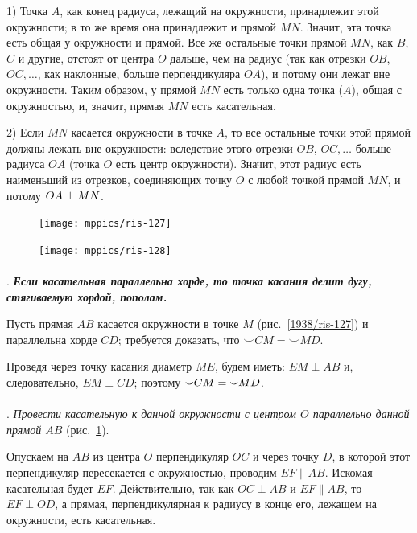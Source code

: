 \documentclass[oneside]{book}
\begin{document}
1) Точка $A$, как конец радиуса, лежащий на окружности, принадлежит этой окружности;
в то же время она принадлежит и прямой $MN$.
Значит, эта точка есть общая у окружности и прямой.
Все же остальные точки прямой $MN$, как $B$, $C$ и другие, отстоят от центра $O$ дальше, чем на радиус (так как отрезки $OB$, $OC,\dots$, как наклонные, больше перпендикуляра $OA$), и потому они лежат вне окружности.
Таким образом, у прямой $MN$ есть только одна точка ($A$), общая с окружностью, и, значит, прямая $MN$ есть касательная.

2) Если $MN$ касается окружности в точке $A$, то все остальные точки этой прямой должны лежать вне окружности: %
вследствие этого отрезки $OB$, $OC,\dots$
больше радиуса $OA$ (точка $O$ есть центр окружности).
Значит, этот радиус есть наименьший из отрезков, соединяющих точку $O$ с любой точкой прямой $MN$, и потому $OA\z\perp MN$.

\begin{figure}
\vskip-11mm
\centering
\texttt{[image: mppics/ris-127]}
\caption{}\label{1938/ris-127}
\bigskip
\texttt{[image: mppics/ris-128]}
\caption{}\label{1938/ris-128}
\end{figure}

\paragraph{}\label{1938/114}
\mbox{.}
\textbf{\emph{Если касательная параллельна хорде, то точка касания делит дугу, стягиваемую хордой, пополам.}}

Пусть прямая $AB$ касается окружности в точке $M$ (рис.~\ref{1938/ris-127}) и параллельна хорде $CD$;
требуется доказать, что ${\smallsmile}CM={\smallsmile}MD$.

Проведя через точку касания диаметр $ME$, будем иметь:
$EM\perp AB$ и, следовательно, $EM\perp CD$;
поэтому ${\smallsmile}CM\z={\smallsmile}MD$.

\paragraph{}\label{1938/115}
\mbox{.}
\emph{Провести касательную к данной окружности с центром $O$ параллельно данной прямой $AB$} (рис.~\ref{1938/ris-128}).

Опускаем на $AB$ из центра $O$ перпендикуляр $OC$ и через точку $D$, в которой этот перпендикуляр пересекается с окружностью, проводим $EF\parallel AB$.
Искомая касательная будет $EF$.
Действительно, так как $OC\perp AB$ и $EF\parallel AB$, то $EF\perp OD$, а прямая, перпендикулярная к радиусу в конце его, лежащем на окружности, есть касательная.
\end{document}
